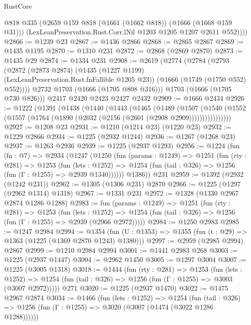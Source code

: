 \begin{lexlean}{RustCore}
\begin{coremodule}
          @818
          @335
          (@2659 @159 @818 (@1661 (@1662 @818)) (@1666 (@1668 @159 @31)))
          (LexLeanPreservation.Rust.Corr.lNil @1203 @1205 @1207 @2611 @552))))
@2866 := @1239 @23
@2867 := @1436 @2866
@2868 := @2865 @2867
@2869 := @1435 @1195
@2870 := @1310 @231
@2872 := @2868 (@2869 @2870)
@2873 := @1435 @29
@2874 := @1334 @231
@2908 := @2619
    (@2774
      (@2784
        (@2793
          (@2872
            (@2873 @2874)
            (@1435 (@1227 @1199) (LexLeanPreservation.Rust.fnFallible @1205 @23))
            (@1666 (@1749 (@1750 @552) @552))))
        @2732
        @1703
        (@1666 (@1705 @808 @316)))
      @1703
      (@1666 (@1705 @730 @826)))
    @2417
    @2420
    @2423
    @2427
    @2432
@2909 := @1666 @2434
@2926 := @1222
    (@1391
      (@1438
        (@1440
          (@1443
            (@1465
              (@1489
                (@1507
                  (@1540
                    (@1552 (@1557 (@1764 (@1890 (@2032 (@2156 (@2601 (@2908 @2909))))))))))))))))
@2927 := @1208 @23
@2931 := @1210 (@1214 @23) (@1220 @23)
@2932 := @1229 @2866
@2934 := @1225 (@2932 @1244)
@2936 := @1267 (@1268 @23)
@2937 := @1263 @2936
@2939 := @1225 (@2937 @1293)
@2956 := @1224
    (fun (fn : @7) =>
    @2934
      (@1247
        (@1250
          (fun (params : @1249) =>
          @1251
            (fun (rty : @281) =>
            @1253
              (fun (lets : @1252) =>
              @1254 (fun (tail : @326) => @1256 (fun (Γ : @1255) => @2939 @1340))))))
        @1386))
    @231
@2959 := @1392 (@2932 (@1242 @231))
@2962 := @1305 (@1306 @231) @2870
@2966 := @1225 (@1297 (@2962 @1314) @1318)
@2967 := @1331 @231
@2972 := @1328 (@1330 @2967 @2874 @1286 @1288)
@2983 := fun (params : @1249) =>
  @1251
    (fun (rty : @281) =>
    @1253
      (fun (lets : @1252) =>
      @1254 (fun (tail : @326) => @1256 (fun (Γ : @1255) => @2939 (@2966 @2972)))))
@2984 := @1250 @2983
@2985 := @1247 @2984
@2994 := @1354 (fun (U : @1353) => @1355 (fun (t : @29) => @1363 (@1225 (@1369 @2870 @1243) @1380)))
@2997 := @2959 (@2985 @2994) @2867
@2999 := @1210 @2984 @2994
@3001 := @1441 @2983 @268
@3003 := @1225 (@2937 @1447)
@3004 := @2962 @1450
@3005 := @1297 @3004
@3007 := @1225 (@3005 @1318)
@3018 := @1444
    (fun (rty : @281) =>
    @1253
      (fun (lets : @1252) =>
      @1254 (fun (tail : @326) => @1256 (fun (Γ : @1255) => @3003 (@3007 @2972)))))
    @271
@3020 := @1225 (@2937 @1470)
@3022 := @1475 @2967 @2874
@3034 := @1466
    (fun (lets : @1252) =>
    @1254
      (fun (tail : @326) => @1256 (fun (Γ : @1255) => @3020 (@3007 (@1474 (@3022 @1286 @1288))))))

\end{coremodule}
\end{lexlean}

